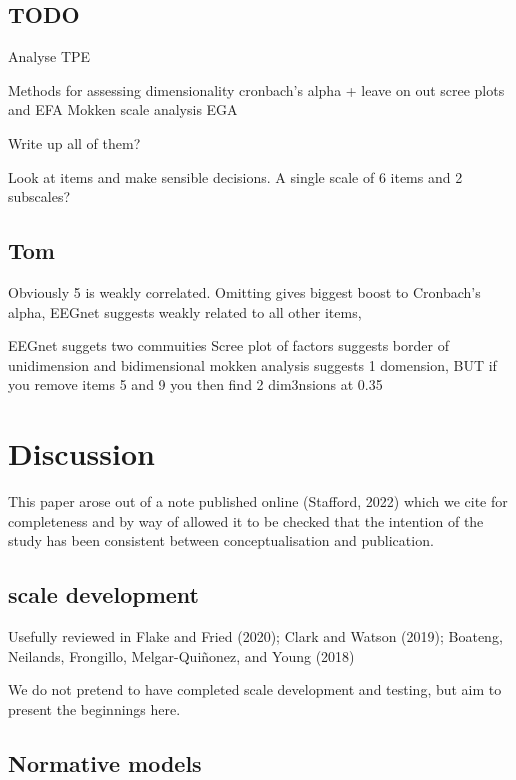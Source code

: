 \documentclass[
  ,jou,floatsintext]{apa6}
\begin{document}
\hypertarget{todo}{%
\subsection{TODO}\label{todo}}

Analyse TPE

Methods for assessing dimensionality
cronbach's alpha + leave on out
scree plots and EFA
Mokken scale analysis
EGA

Write up all of them?

Look at items and make sensible decisions. A single scale of 6 items and 2 subscales?

\hypertarget{tom}{%
\subsection{Tom}\label{tom}}

Obviously 5 is weakly correlated. Omitting gives biggest boost to Cronbach's alpha, EEGnet suggests weakly related to all other items,

EEGnet suggets two commuities
Scree plot of factors suggests border of unidimension and bidimensional
mokken analysis suggests 1 domension, BUT if you remove items 5 and 9 you then find 2 dim3nsions at 0.35

\hypertarget{discussion}{%
\section{Discussion}\label{discussion}}

This paper arose out of a note published online (Stafford, 2022) which we cite for completeness and by way of allowed it to be checked that the intention of the study has been consistent between conceptualisation and publication.

\hypertarget{scale-development}{%
\subsection{scale development}\label{scale-development}}

Usefully reviewed in Flake and Fried (2020); Clark and Watson (2019); Boateng, Neilands, Frongillo, Melgar-Quiñonez, and Young (2018)

We do not pretend to have completed scale development and testing, but aim to present the beginnings here.

\hypertarget{normative-models}{%
\subsection{Normative models}\label{normative-models}}
\end{document}
